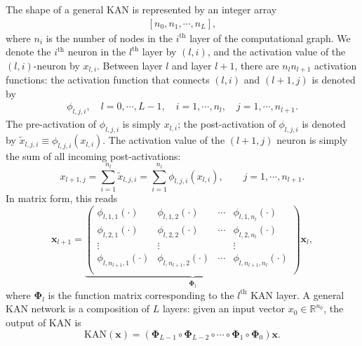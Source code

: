 \documentclass[12pt]{caltech_thesis}
\numberwithin{equation}{section}
\begin{document}
The shape of a general KAN is represented by an integer array 
\begin{align}\label{arraykan}
    [n_0,n_1,\cdots,n_L],
\end{align}
where $n_i$ is the number of nodes in the $i^{\text{th}}$ layer of the computational graph. We denote the $i^{\text{th}}$ neuron in the $l^{\text{th}}$ layer by $(l,i)$, and the activation value of the $(l,i)$-neuron by $x_{l,i}$. Between layer $l$ and layer $l+1$, there are $n_ln_{l+1}$ activation functions: the activation function that connects $(l,i)$ and $(l+1,j)$ is denoted by 
\begin{align}
    \phi_{l,j,i},\quad l=0,\cdots, L-1,\quad i=1,\cdots,n_{l},\quad j=1,\cdots,n_{l+1}.
\end{align}
The pre-activation of $\phi_{l,j,i}$ is simply $x_{l,i}$; the post-activation of $\phi_{l,j,i}$ is denoted by $\tilde{x}_{l,j,i}\equiv \phi_{l,j,i}(x_{l,i})$. The activation value of the $(l+1,j)$ neuron is simply the sum of all incoming post-activations: 
\begin{equation}\label{eq:kanforward}
    x_{l+1,j} =  \sum_{i=1}^{n_l} \tilde{x}_{l,j,i} = \sum_{i=1}^{n_l}\phi_{l,j,i}(x_{l,i}), \qquad j=1,\cdots,n_{l+1}.
\end{equation}
In matrix form, this reads
\begin{equation}\label{eq:kanforwardmatrix}
    \mathbf{x}_{l+1} = 
    \underbrace{\begin{pmatrix}
        \phi_{l,1,1}(\cdot) & \phi_{l,1,2}(\cdot) & \cdots & \phi_{l,1,n_{l}}(\cdot) \\
        \phi_{l,2,1}(\cdot) & \phi_{l,2,2}(\cdot) & \cdots & \phi_{l,2,n_{l}}(\cdot) \\
        \vdots & \vdots & & \vdots \\
        \phi_{l,n_{l+1},1}(\cdot) & \phi_{l,n_{l+1},2}(\cdot) & \cdots & \phi_{l,n_{l+1},n_{l}}(\cdot) \\
    \end{pmatrix}}_{\mathbf{\Phi}_l}
    \mathbf{x}_{l},
\end{equation}
where ${\mathbf \Phi}_l$ is the function matrix corresponding to the $l^{\text{th}}$ KAN layer. A general KAN network is a composition of $L$ layers: given an input vector  $x_0\in\mathbb{R}^{n_0}$, the output of KAN is
\begin{equation}\label{eq:KAN_forward}
    {\text{KAN}}(\mathbf{x}) = (\mathbf{\Phi}_{L-1}\circ \mathbf{\Phi}_{L-2}\circ\cdots\circ\mathbf{\Phi}_{1}\circ\mathbf{\Phi}_{0})\mathbf{x}.
\end{equation}
\end{document}
